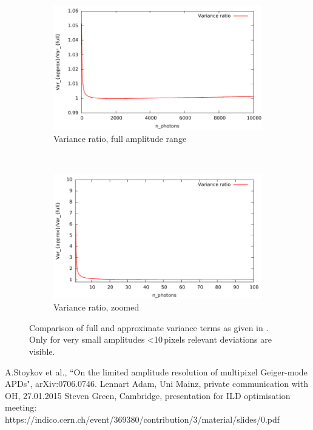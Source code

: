 \documentclass[12pt]{article} %
\begin{document}
\begin{appendices}
\begin{figure}
\begin{subfigure}[b]{0.5\textwidth}
                \includegraphics[width=\textwidth]{fig/comp_variance/ratio}
                \caption{Variance ratio, full amplitude range}
                \label{fig:ratio_full}
        \end{subfigure}%
        ~ %
        \begin{subfigure}[b]{0.5\textwidth}
                \includegraphics[width=\textwidth]{fig/comp_variance/ratio_zoom}
                \caption{Variance ratio, zoomed}
                \label{fig:ratio_zoom}
        \end{subfigure}
        \caption{Comparison of full and approximate variance terms as given in \cite{PPD}. Only for very small amplitudes  \textless 10\,pixels relevant deviations are visible.} \label{fig:variance}
\end{figure}
\end{appendices}


\begin{thebibliography}{99}
A.Stoykov et al., ``On the limited amplitude resolution of multipixel Geiger-mode APDs", arXiv:0706.0746.
Lennart Adam, Uni Mainz, private communication with OH, 27.01.2015
Steven Green, Cambridge, presentation for ILD optimisation meeting: https://indico.cern.ch/event/369380/contribution/3/material/slides/0.pdf

\end{thebibliography}
\end{document}
